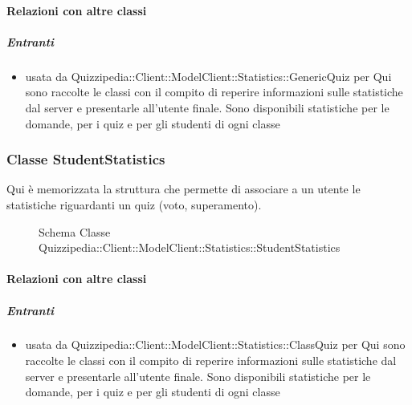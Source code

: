 \paragraph{Relazioni con altre classi}
\subparagraph{Entranti}
\begin{itemize}
\item usata da Quizzipedia::Client::ModelClient::Statistics::GenericQuiz per Qui sono raccolte le classi con il compito di reperire informazioni sulle statistiche dal server e presentarle all'utente finale. Sono disponibili statistiche per le domande, per i quiz e per gli studenti di ogni classe
\end{itemize}
\subsubsection{Classe StudentStatistics}
Qui è memorizzata la struttura che permette di associare a un utente le statistiche riguardanti un quiz (voto, superamento).
\begin{figure}[H]
\centering
\noindent{}
\caption[Schema Classe StudentStatistics]{Schema Classe Quizzipedia::Client::ModelClient::Statistics::StudentStatistics}
\end{figure}
\paragraph{Relazioni con altre classi}
\subparagraph{Entranti}
\begin{itemize}
\item usata da Quizzipedia::Client::ModelClient::Statistics::ClassQuiz per Qui sono raccolte le classi con il compito di reperire informazioni sulle statistiche dal server e presentarle all'utente finale. Sono disponibili statistiche per le domande, per i quiz e per gli studenti di ogni classe
\end{itemize}
